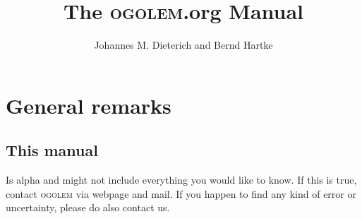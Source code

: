 \documentclass[a4paper,10pt]{scrbook}
\author{Johannes M. Dieterich and Bernd Hartke}
\title{The \textsc{ogolem}.org Manual}
\newcommand{\ogo}{\textsc{ogolem}}
\begin{document}
\maketitle

\tableofcontents



\chapter{General remarks}
\section{This manual}
Is alpha and might not include everything you would like to know. If this is
true, contact \ogo{} via webpage and mail. If you happen to find any kind of
error or uncertainty, please do also contact us.
\end{document}
